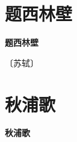 \documentclass[12pt,UTF-8,openany,fontset=none]{ctexbook}
\begin{document}
\vspace{8pt}
\clearpage


\section{题西林壁}



\begin{center}
    {\bfseries 题西林壁}
\end{center}

\begin{center}
    \vspace{10pt}
    
    \begin{large}
        
        〔苏轼〕
        
    \end{large}
    
    \vspace{8pt}
    
    \begin{huge}
        
        \phantom{。}

        \phantom{。}
        
        \phantom{。}

        \phantom{。}
        
    \end{huge}
    
\end{center}

\vspace{8pt}
\clearpage


\section{秋浦歌}



\begin{center}
    {\bfseries 秋浦歌}
\end{center}
\end{document}

